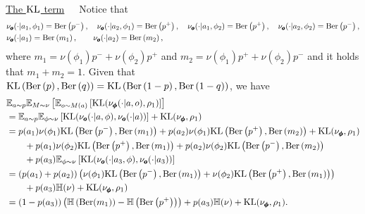 \noindent\underline{The $\text{KL}$ term}\ \ \ Notice that 
\begin{align*}
    &\nu_{\pmb{o}}(\cdot|a_1, \phi_1) = \text{Ber}\left(p^-\right),  \quad  \nu_{\pmb{o}}(\cdot|a_2, \phi_1) = \text{Ber}\left(p^+\right), \quad \nu_{\pmb{o}}(\cdot|a_1, \phi_2) = \text{Ber}\left(p^+\right),  \quad \nu_{\pmb{o}}(\cdot|a_2, \phi_2) = \text{Ber}\left(p^-\right),
    \\&\nu_{\pmb{o}}(\cdot|a_1) =\text{Ber}\left(m_1\right),  \qquad \nu_{\pmb{o}}(\cdot|a_2) =\text{Ber}\left(m_2\right),
\end{align*}
where $m_1 = \nu(\phi_1)p^- +  \nu(\phi_2)p^+$ and $m_2 =\nu(\phi_1)p^+ +  \nu(\phi_2)p^-$ and it holds that $m_1 + m_2 = 1$.  Given that $\text{KL}\left(\text{Ber}\left(p\right), \text{Ber}\left(q\right)\right) = \text{KL}\left(\text{Ber}\left(1-p\right), \text{Ber}\left(1-q\right)\right)$, we have
\begin{align*}
&\mathbb{E}_{a\sim p} \mathbb{E}_{M\sim \nu} \left[\mathbb{E}_{o\sim M(a)}\left[\text{KL}(\nu_{\pmb{\phi}}(\cdot|a, o), \rho_1)\right]\right]
\\&= \mathbb{E}_{a\sim p} \mathbb{E}_{\phi \sim \nu}\left[\text{KL}(\nu_{\pmb{o}}(\cdot|a, \phi), \nu_{\pmb{o}}(\cdot|a))\right]+ \text{KL}(\nu_{\pmb{\phi}}, \rho_1)
\\&= p(a_1)\nu(\phi_1)\text{KL}\left(\text{Ber}\left(p^-\right),  \text{Ber}\left(m_1\right)\right) +  p(a_2)\nu(\phi_1)\text{KL}\left(\text{Ber}\left(p^+\right),  \text{Ber}\left(m_2\right)\right) + \text{KL}(\nu_{\pmb{\phi}}, \rho_1)
    \\&\qquad + p(a_1)\nu(\phi_2)\text{KL}\left(\text{Ber}\left(p^+\right),  \text{Ber}\left(m_1\right)\right) +  p(a_2)\nu(\phi_2)\text{KL}\left(\text{Ber}\left(p^-\right),  \text{Ber}\left(m_2\right)\right) 
    \\&\qquad + p(a_3)\mathbb{E}_{\phi \sim \nu}\left[\text{KL}(\nu_{\pmb{o}}(\cdot|a_3, \phi), \nu_{\pmb{o}}(\cdot|a_3))\right]
    \\&=  \left(p(a_1) + p(a_2)\right)\left(\nu(\phi_1)\text{KL}\left(\text{Ber}\left(p^-\right),  \text{Ber}\left(m_1\right)\right) + \nu(\phi_2)\text{KL}\left(\text{Ber}\left(p^+\right),  \text{Ber}\left(m_1\right)\right)\right)
    \\&\qquad + p(a_3)\mathbb{H}(\nu) + \text{KL}(\nu_{\pmb{\phi}}, \rho_1)
    \\&= \left(1-p(a_3)\right)\left(\mathbb{H}\left(\text{Ber}(m_1)\right) - \mathbb{H}\left(\text{Ber}\left(p^+\right)\right)\right) + p(a_3)\mathbb{H}(\nu) +  \text{KL}(\nu_{\pmb{\phi}}, \rho_1). 
\end{align*}

